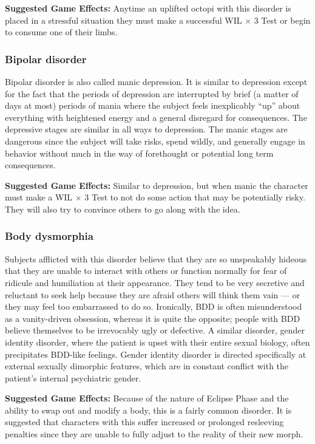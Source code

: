 \textbf{Suggested Game Effects:} Anytime an uplifted octopi with this disorder is placed in a stressful situation they must make a successful WIL $\times$ 3 Test or begin to consume one of their limbs. 

\subsubsection{Bipolar disorder} 

Bipolar disorder is also called manic depression. It is similar to depression except for the fact that the periods of depression are interrupted by brief (a matter of days at most) periods of mania where the subject feels inexplicably ``up” about everything with heightened energy and a general disregard for consequences. The depressive stages are similar in all ways to depression. The manic stages are dangerous since the subject will take risks, spend wildly, and generally engage in behavior without much in the way of forethought or potential long term consequences. 

\textbf{Suggested Game Effects:} Similar to depression, but when manic the character must make a WIL $\times$ 3 Test to not do some action that may be potentially risky. They will also try to convince others to go along with the idea. 

\subsubsection{Body dysmorphia} 

Subjects afflicted with this disorder believe that they are so unspeakably hideous that they are unable to interact with others or function normally for fear of ridicule and humiliation at their appearance. They tend to be very secretive and reluctant to seek help because they are afraid others will think them vain --- or they may feel too embarrassed to do so. Ironically, BDD is often misunderstood as a vanity-driven obsession, whereas it is quite the opposite; people with BDD believe themselves to be irrevocably ugly or defective. A similar disorder, gender identity disorder, where the patient is upset with their entire sexual biology, often precipitates BDD-like feelings. Gender identity disorder is directed specifically at external sexually dimorphic features, which are in constant conflict with the patient’s internal psychiatric gender. 

\textbf{Suggested Game Effects:} Because of the nature of Eclipse Phase and the ability to swap out and modify a body, this is a fairly common disorder. It is suggested that characters with this suffer increased or prolonged resleeving penalties since they are unable to fully adjust to the reality of their new morph. 

